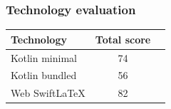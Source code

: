 \begin{frame}
    \frametitle{Technology evaluation}
    \par\vspace{0.5cm}
    \centering
    \begin{table}[H]
        \centering
        \begin{tabular}{|l|c|c|}
            \hline
            \textbf{Technology} & \textbf{Total score} \\
            \hline
            Kotlin minimal & 74 \\
            \hline
            Kotlin bundled & 56 \\
            \hline
            Web SwiftLaTeX & 82 \\
            \hline
        \end{tabular}
        \label{table:technology_evaluation}
    \end{table}
\end{frame}
